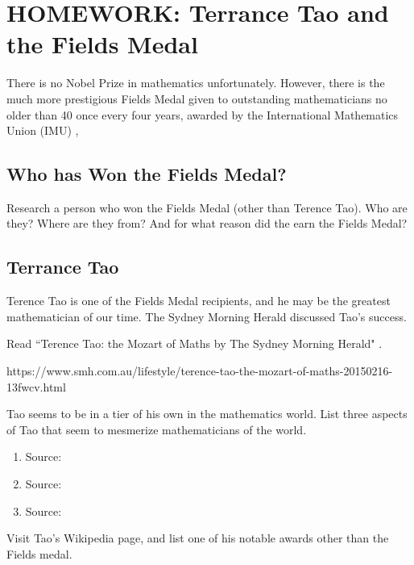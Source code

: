 
\section{HOMEWORK: Terrance Tao and the Fields Medal}

There is no Nobel Prize in mathematics unfortunately. However, there is the much more prestigious Fields Medal given to outstanding mathematicians no older than 40 once every four years, awarded by the International Mathematics Union (IMU) \cite{IMU},

\subsection{Who has Won the Fields Medal?} 

\begin{exercise}
Research a person who won the Fields Medal (other than Terence Tao). Who are they? Where are they from? And for what reason did the earn the Fields Medal?
\end{exercise}

\blanks
\blanks

\subsection{Terrance Tao}

Terence Tao is one of the Fields Medal recipients, and he may be the greatest mathematician of our time. The Sydney Morning Herald discussed Tao's success.

\begin{exercise}
Read ``Terence Tao: the Mozart of Maths by The Sydney Morning Herald" \cite{tao}.
\end{exercise}
{\footnotesize https://www.smh.com.au/lifestyle/terence-tao-the-mozart-of-maths-20150216-13fwcv.html}

\begin{exercise}
Tao seems to be in a tier of his own in the mathematics world. List three aspects of Tao that seem to mesmerize mathematicians of the world.
\end{exercise}

\begin{enumerate}
    \item \hspace{1.5in} Source: \\
    \item \hspace{1.5in} Source: \\
    \item \hspace{1.5in} Source: 
\end{enumerate}

\begin{exercise}
Visit Tao’s Wikipedia page, and list one of his notable awards other than the Fields medal.
\end{exercise}

\blanks

